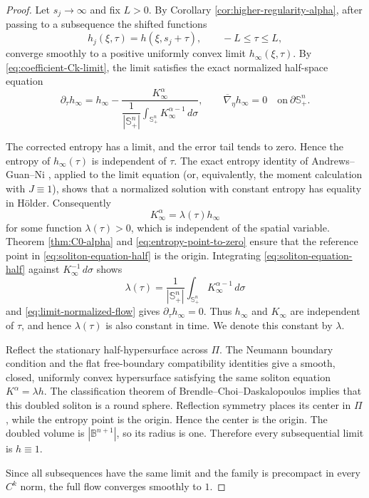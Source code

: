 \documentclass[11pt, reqno]{amsart}
\theoremstyle{remark}
\theoremstyle{definition}
\numberwithin{equation}{section}
\newcommand{\B}{\mathbb B}
\newcommand{\PiH}{\Pi}
\newcommand{\dd}{\,d}
\begin{document}
\begin{proof}
Let $s_j\to\infty$ and fix $L>0$.  By Corollary
\ref{cor:higher-regularity-alpha}, after passing to a subsequence the shifted
functions
\begin{equation*}
        h_j(\xi,\tau)=h(\xi,s_j+\tau),
        \qquad -L\le\tau\le L,
\end{equation*}
converge smoothly to a positive uniformly convex limit $h_\infty(\xi,\tau)$.
By \eqref{eq:coefficient-Ck-limit}, the limit satisfies the exact normalized
half-space equation
\begin{equation}\label{eq:limit-normalized-flow}
        \partial_\tau h_\infty
        =h_\infty-
        \frac{K_\infty^\alpha}
        {\dfrac{1}{|\mathbb{S}_+^n|} \displaystyle\int_{\mathbb{S}_+^n}K_\infty^{\alpha-1}\dd \sigma},
        \qquad \overline{\nabla}_\eta h_\infty=0\quad \text{on}~\partial\mathbb{S}^n_+.
\end{equation}

The corrected entropy has a limit, and the error tail tends to zero. Hence the entropy of $h_\infty(\tau)$ is independent of $\tau$.  The exact entropy identity of Andrews--Guan--Ni \cite{AGN2016}, applied to the limit equation (or, equivalently, the moment calculation with $J\equiv1$), shows
that a normalized solution with constant entropy has equality in H\"older.
Consequently
\begin{equation}\label{eq:soliton-equation-half}
        K_\infty^\alpha=\lambda(\tau) h_\infty
\end{equation}
for some function $\lambda(\tau)>0$, which is independent of the spatial variable.  Theorem \ref{thm:C0-alpha} and \eqref{eq:entropy-point-to-zero} ensure that the reference point in \eqref{eq:soliton-equation-half} is the origin.  Integrating \eqref{eq:soliton-equation-half} against $K_\infty^{-1}\dd\sigma$ shows
\begin{equation*}
    \lambda(\tau)=\dfrac{1}{|\mathbb{S}_+^n|} \int_{\mathbb{S}_+^n}K_\infty^{\alpha-1}\dd \sigma
\end{equation*}
 and
\eqref{eq:limit-normalized-flow} gives $\partial_\tau h_\infty=0$. Thus $h_\infty$ and $K_\infty$ are independent of $\tau$, and
hence $\lambda(\tau)$ is also constant in time. We denote this
constant by $\lambda$.

Reflect the stationary half-hypersurface across $\PiH$.  The Neumann boundary condition and the flat free-boundary compatibility identities give a smooth, closed, uniformly convex hypersurface satisfying the same soliton equation $K^\alpha=\lambda h$. The classification theorem of Brendle--Choi--Daskalopoulos \cite{BCD2017} implies that this doubled soliton is a round sphere. Reflection symmetry places its center in $\PiH$, while the entropy point is the origin. Hence the center is the origin. The doubled volume is $|\B^{n+1}|$, so its radius is one. Therefore every subsequential limit is $h\equiv1$.

Since all subsequences have the same limit and the family is precompact in every $C^k$ norm, the full flow converges smoothly to $1$.
\end{proof}
\end{document}
